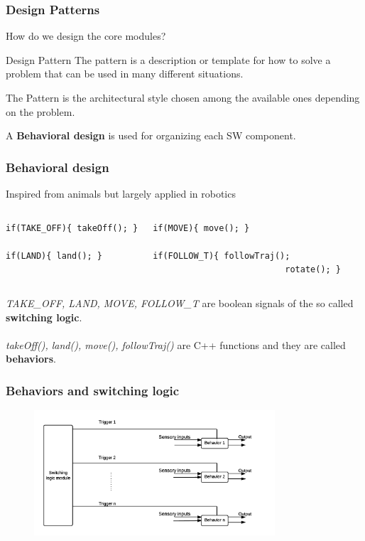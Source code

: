 \documentclass[xcolor=dvipsnames]{beamer}
\begin{document}
\begin{frame}[t]
\frametitle{Design Patterns}
How do we design the core modules?
\vspace{3em}
\begin{block}{Design Pattern}
The pattern is a description or template for how to solve a problem that can be used in many different situations.
\end{block}
The Pattern is the architectural style chosen among the available ones depending on the problem. 

\vspace{2em}
A \textbf{Behavioral design} is used for organizing each SW component.

\end{frame}

\begin{frame}[t,fragile]
\frametitle{Behavioral design}
Inspired from animals but largely applied in robotics

\begin{columns}[t]
\begin{verbatim}
if(TAKE_OFF){ takeOff(); }

if(LAND){ land(); }
\end{verbatim}
\begin{verbatim}
if(MOVE){ move(); }

if(FOLLOW_T){ followTraj(); 
			              rotate(); }
\end{verbatim}

\end{columns}
\vspace{2em}
\textit{TAKE\_OFF, LAND, MOVE, FOLLOW\_T} are boolean signals of the so called \textbf{switching logic}.  \\~\\ 

\textit{takeOff(), land(), move(), followTraj()} are C++ functions and they are called \textbf{behaviors}.
\end{frame}

\begin{frame}[t]
\frametitle{Behaviors and switching logic}

\begin{figure}
\includegraphics[width = 0.8\textwidth]{f/switch.png}
\end{figure}

\end{frame}
\end{document}

